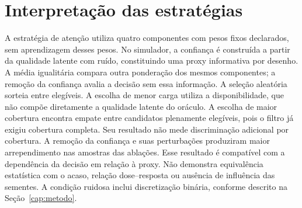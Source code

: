 \section{Interpretação das estratégias}
A estratégia de atenção utiliza quatro componentes com pesos fixos declarados, sem aprendizagem desses pesos. No simulador, a confiança é construída a partir da qualidade latente com ruído, constituindo uma proxy informativa por desenho. A média igualitária compara outra ponderação dos mesmos componentes; a remoção da confiança avalia a decisão sem essa informação.
A seleção aleatória sorteia entre elegíveis. A escolha de menor carga utiliza a disponibilidade, que não compõe diretamente a qualidade latente do oráculo. A escolha de maior cobertura encontra empate entre candidatos plenamente elegíveis, pois o filtro já exigiu cobertura completa. Seu resultado não mede discriminação adicional por cobertura.
A remoção da confiança e suas perturbações produziram maior arrependimento nas amostras das ablações. Esse resultado é compatível com a dependência da decisão em relação à proxy. Não demonstra equivalência estatística com o acaso, relação dose--resposta ou ausência de influência das sementes. A condição ruidosa inclui discretização binária, conforme descrito na Seção~\ref{cap:metodo}.
